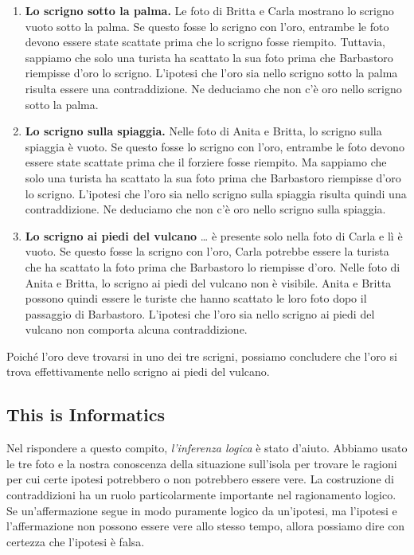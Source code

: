 \documentclass[a4paper,11pt]{report}
\begin{document}
\begin{enumerate}
  \item \textbf{Lo scrigno sotto la palma.}
Le foto di Britta e Carla mostrano lo scrigno vuoto sotto la palma. Se questo fosse lo scrigno con l’oro, entrambe le foto devono essere state scattate prima che lo scrigno fosse riempito. Tuttavia, sappiamo che solo una turista ha scattato la sua foto prima che Barbastoro riempisse d’oro lo scrigno. L’ipotesi che l’oro sia nello scrigno sotto la palma risulta essere una contraddizione. Ne deduciamo che non c’è oro nello scrigno sotto la palma.
  \item \textbf{Lo scrigno sulla spiaggia.}
Nelle foto di Anita e Britta, lo scrigno sulla spiaggia è vuoto. Se questo fosse lo scrigno con l’oro, entrambe le foto devono essere state scattate prima che il forziere fosse riempito. Ma sappiamo che solo una turista ha scattato la sua foto prima che Barbastoro riempisse d’oro lo scrigno. L’ipotesi che l’oro sia nello scrigno sulla spiaggia risulta quindi una contraddizione. Ne deduciamo che non c’è oro nello scrigno sulla spiaggia.
  \item \textbf{Lo scrigno ai piedi del vulcano}
… è presente solo nella foto di Carla e lì è vuoto. Se questo fosse la scrigno con l’oro, Carla potrebbe essere la turista che ha scattato la foto prima che Barbastoro lo riempisse d’oro. Nelle foto di Anita e Britta, lo scrigno ai piedi del vulcano non è visibile.  Anita e Britta possono quindi essere le turiste che hanno scattato le loro foto dopo il passaggio di Barbastoro.  L’ipotesi che l’oro sia nello scrigno ai piedi del vulcano non comporta alcuna contraddizione.
\end{enumerate}

Poiché l’oro deve trovarsi in uno dei tre scrigni, possiamo concludere che l’oro si trova effettivamente nello scrigno ai piedi del vulcano.


\subsection*{This is Informatics}

Nel rispondere a questo compito, \emph{l’inferenza logica} è stato d’aiuto.
Abbiamo usato le tre foto e la nostra conoscenza della situazione sull’isola per trovare le ragioni per cui certe ipotesi potrebbero o non potrebbero essere vere.
La costruzione di contraddizioni ha un ruolo particolarmente importante nel ragionamento logico.
Se un’affermazione segue in modo puramente logico da un’ipotesi, ma l’ipotesi e l’affermazione non possono essere vere allo stesso tempo, allora possiamo dire con certezza che l’ipotesi è falsa.
\end{document}
